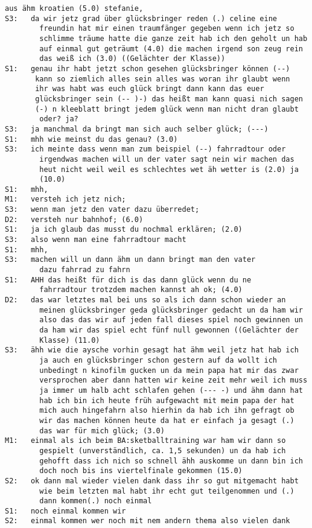 \begin{lstlisting}[language={}]
        aus ähm kroatien (5.0) stefanie,
S3:   da wir jetz grad über glücksbringer reden (.) celine eine  
        freundin hat mir einen traumfänger gegeben wenn ich jetz so    
        schlimme träume hatte die ganze zeit hab ich den geholt un hab 
        auf einmal gut geträumt (4.0) die machen irgend son zeug rein 
        das weiß ich (3.0) ((Gelächter der Klasse))
S1:   genau ihr habt jetzt schon gesehen glücksbringer können (--) 
       kann so ziemlich alles sein alles was woran ihr glaubt wenn 
       ihr was habt was euch glück bringt dann kann das euer 
       glücksbringer sein (-- )-) das heißt man kann quasi nich sagen 
       (-) n kleeblatt bringt jedem glück wenn man nicht dran glaubt 
        oder? ja?
S3:   ja manchmal da bringt man sich auch selber glück; (---)
S1:   mhh wie meinst du das genau? (3.0)
S3:   ich meinte dass wenn man zum beispiel (--) fahrradtour oder 
        irgendwas machen will un der vater sagt nein wir machen das    
        heut nicht weil weil es schlechtes wet äh wetter is (2.0) ja 
        (10.0)
S1:   mhh,
M1:   versteh ich jetz nich;
S3:   wenn man jetz den vater dazu überredet;
D2:   versteh nur bahnhof; (6.0)
S1:   ja ich glaub das musst du nochmal erklären; (2.0)
S3:   also wenn man eine fahrradtour macht
S1:   mhh,
S3:   machen will un dann ähm un dann bringt man den vater        
        dazu fahrrad zu fahrn
S1:   AHH das heißt für dich is das dann glück wenn du ne 
        fahrradtour trotzdem machen kannst ah ok; (4.0)
D2:   das war letztes mal bei uns so als ich dann schon wieder an 
        meinen glücksbringer geda glücksbringer gedacht un da ham wir 
        also das das wir auf jeden fall dieses spiel noch gewinnen un 
        da ham wir das spiel echt fünf null gewonnen ((Gelächter der 
        Klasse) (11.0)
S3:   ähh wie die aysche vorhin gesagt hat ähm weil jetz hat hab ich  
        ja auch en glücksbringer schon gestern auf da wollt ich 
        unbedingt n kinofilm gucken un da mein papa hat mir das zwar 
        versprochen aber dann hatten wir keine zeit mehr weil ich muss 
        ja immer um halb acht schlafen gehen (--- -) und ähm dann hat 
        hab ich bin ich heute früh aufgewacht mit meim papa der hat 
        mich auch hingefahrn also hierhin da hab ich ihn gefragt ob 
        wir das machen können heute da hat er einfach ja gesagt (.) 
        das war für mich glück; (3.0)
M1:   einmal als ich beim BA:sketballtraining war ham wir dann so 
        gespielt (unverständlich, ca. 1,5 sekunden) un da hab ich 
        gehofft dass ich nich so schnell ähh auskomme un dann bin ich 
        doch noch bis ins viertelfinale gekommen (15.0)
S2:   ok dann mal wieder vielen dank dass ihr so gut mitgemacht habt 
        wie beim letzten mal habt ihr echt gut teilgenommen und (.) 
        dann kommen(.) noch einmal
S1:   noch einmal kommen wir 
S2:   einmal kommen wer noch mit nem andern thema also vielen dank
\end{lstlisting}